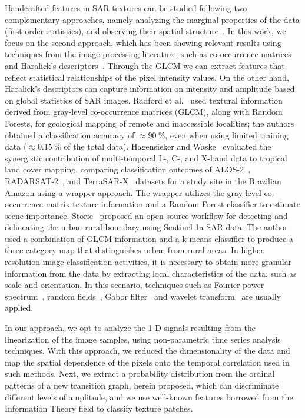 \documentclass[journal]{IEEEtran}
\begin{document}
    Handcrafted features in SAR textures can be studied following two complementary approaches, namely analyzing the marginal properties of the data (first-order statistics), and observing their spatial structure~\cite{Yue2020Gaussian, numbisi2018multi}.
	In this work, we focus on the second approach, which has been showing relevant results using techniques from the image processing literature, such as co-occurrence matrices and Haralick's descriptors~\cite{yu2019detection}.
	Through the GLCM we can extract features that reflect statistical relationships of the pixel intensity values.
    On the other hand, Haralick's descriptors can capture information on intensity and amplitude based on global statistics of SAR images.
	Radford et al.~\cite{radford2018geological} used textural information derived from gray-level co-occurrence matrices (GLCM), along with Random Forests, for geological mapping of remote and inaccessible localities; the authors obtained a classification accuracy of $\approx\SI{90}{\percent}$, even when using limited training data ($\approx\SI{0.15}{\percent}$ of the total data). 	
	Hagensieker and Waske~\cite{hagensieker2018evaluation} evaluated the synergistic contribution of multi-temporal L-, C-, and X-band data to tropical land cover mapping, comparing classification outcomes of ALOS-2~\cite{kankaku2013alos}, RADARSAT-2~\cite{morena2004introduction}, and TerraSAR-X~\cite{breit2009terrasar} datasets for a study site in the Brazilian Amazon using a wrapper approach. 
	The wrapper utilizes the gray-level co-occurrence matrix texture information and a  Random Forest classifier to estimate scene importance. 	
	Storie~\cite{storie2018urban} proposed an open-source workflow for detecting and delineating the urban-rural boundary using Sentinel-1a SAR data.
	The author used a combination of GLCM information and a k-means classifier to produce a three-category map that distinguishes urban from rural areas. 
	In higher resolution image classification activities, it is necessary to obtain more granular information from the data by extracting local characteristics of the data, such as scale and orientation.
    In this scenario, techniques such as Fourier power spectrum~\cite{Florindo2012Fractal}, random fields~\cite{zhu2016antarctic}, Gabor filter~\cite{dumitru2014information} and wavelet transform~\cite{akbarizadeh2012new} are usually applied.
	
	In our approach, we opt to analyze the 1-D signals resulting from the linearization of the image samples, using non-parametric time series analysis techniques.
	With this approach, we reduced the dimensionality of the data and map the spatial dependence of the pixels onto the temporal correlation used in such methods.
	Next, we extract a probability distribution from the ordinal patterns of a new transition graph, herein proposed, which can discriminate different levels of amplitude, and we use well-known features borrowed from the Information Theory field to classify texture patches.
	
\end{document}
